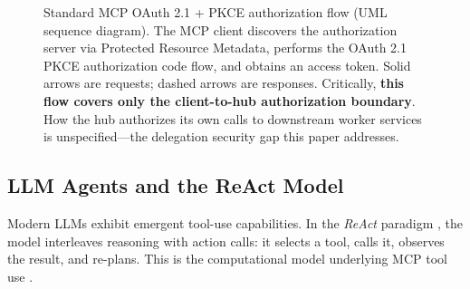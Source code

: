 \documentclass[journal]{IEEEtran}
\theoremstyle{definition}
\begin{document}
\begin{figure}[!t]
\caption{Standard MCP OAuth 2.1 + PKCE authorization flow (UML sequence
diagram). The MCP client discovers the authorization server via Protected
Resource Metadata, performs the OAuth 2.1 PKCE authorization code flow, and
obtains an access token. Solid arrows are requests; dashed arrows are
responses. Critically, \textbf{this flow covers only the client-to-hub
authorization boundary}. How the hub authorizes its own calls to downstream
worker services is unspecified---the delegation security gap this paper
addresses.}
\label{fig:mcp_std_auth}
\end{figure}


\subsection{LLM Agents and the ReAct Model}

Modern LLMs exhibit emergent tool-use capabilities. In the \textit{ReAct}
paradigm \cite{yao2022react}, the model interleaves reasoning with action
calls: it selects a tool, calls it, observes the result, and re-plans. This
is the computational model underlying MCP tool use \cite{wang2024survey}.
\end{document}
